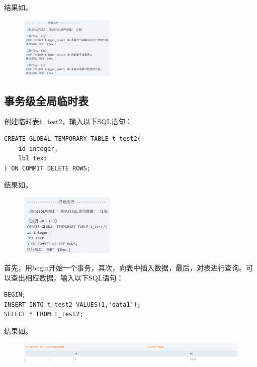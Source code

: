 \documentclass[lang=cn,11pt,a4paper,cite=authornum]{paper}
\begin{document}
结果如。
\begin{figure}[!htb]
    \centering
    \includegraphics[width=0.4\textwidth]{./images/res43.png}
    \caption{\label{fig:res43}}
\end{figure}

\subsection{事务级全局临时表}

创建临时表t\_test2，输入以下SQL语句：
\begin{code}
\begin{verbatim}
CREATE GLOBAL TEMPORARY TABLE t_test2(
    id integer,
    lbl text
) ON COMMIT DELETE ROWS;
\end{verbatim}
\end{code}

结果如。
\begin{figure}[!htb]
    \centering
    \includegraphics[width=0.4\textwidth]{./images/res44.png}
    \caption{\label{fig:res44}}
\end{figure}

首先，用begin开始一个事务，其次，向表中插入数据，最后，对表进行查询。可以查出相应数据，输入以下SQL语句：
\begin{code}
\begin{verbatim}
BEGIN;
INSERT INTO t_test2 VALUES(1,'data1');
SELECT * FROM t_test2;
\end{verbatim}
\end{code}

结果如。
\begin{figure}[!htb]
    \centering
    \includegraphics[width=\textwidth]{./images/res45.png}
    \caption{\label{fig:res45}}
\end{figure}
\end{document}
